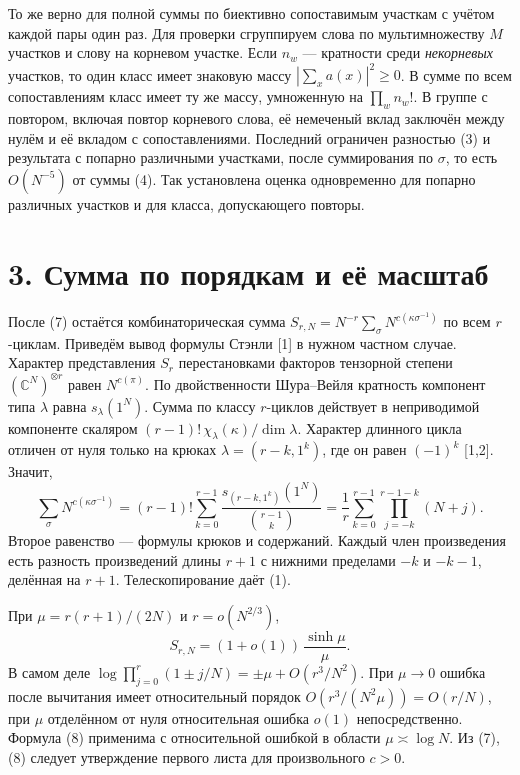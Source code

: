 \documentclass[11pt,a4paper]{article}
\newcommand{\C}{\mathbb C}
\newcommand{\sect}[1]{\section*{\sffamily\color{ink}#1}}
\begin{document}
То же верно для полной суммы по биективно сопоставимым участкам с учётом каждой пары один раз. Для проверки сгруппируем слова по мультимножеству $M$ участков и слову на корневом участке. Если $n_w$ --- кратности среди \emph{некорневых} участков, то один класс имеет знаковую массу $|\sum_x a(x)|^2\ge0$. В сумме по всем сопоставлениям класс имеет ту же массу, умноженную на $\prod_w n_w!$. В группе с повтором, включая повтор корневого слова, её немеченый вклад заключён между нулём и её вкладом с сопоставлениями. Последний ограничен разностью (3) и результата с попарно различными участками, после суммирования по $\sigma$, то есть $O(N^{-5})$ от суммы (4). Так установлена оценка одновременно для попарно различных участков и для класса, допускающего повторы.
\newpage
\sect{3. Сумма по порядкам и её масштаб}
После (7) остаётся комбинаторическая сумма $S_{r,N}=N^{-r}\sum_{\sigma}N^{c(\kappa\sigma^{-1})}$ по всем $r$-циклам. Приведём вывод формулы Стэнли [1] в нужном частном случае. Характер представления $S_r$ перестановками факторов тензорной степени $(\C^N)^{\otimes r}$ равен $N^{c(\pi)}$. По двойственности Шура--Вейля кратность компонент типа $\lambda$ равна $s_\lambda(1^N)$. Сумма по классу $r$-циклов действует в неприводимой компоненте скаляром $(r-1)!\,\chi_\lambda(\kappa)/\dim\lambda$. Характер длинного цикла отличен от нуля только на крюках $\lambda=(r-k,1^k)$, где он равен $(-1)^k$ [1,2]. Значит,
\[
    \sum_{\sigma}N^{c(\kappa\sigma^{-1})}
       =(r-1)!\sum_{k=0}^{r-1}
           \frac{s_{(r-k,1^k)}(1^N)}{\binom{r-1}{k}}
       =\frac1r\sum_{k=0}^{r-1}\prod_{j=-k}^{r-1-k}(N+j).
\]
Второе равенство --- формулы крюков и содержаний. Каждый член произведения есть разность произведений длины $r+1$ с нижними пределами $-k$ и $-k-1$, делённая на $r+1$. Телескопирование даёт (1).

При $\mu=r(r+1)/(2N)$ и $r=o(N^{2/3})$,
\[
             S_{r,N}=(1+o(1))\,\frac{\sinh\mu}{\mu}.                  \tag{8}
\]
В самом деле $\log\prod_{j=0}^r(1\pm j/N)=\pm\mu+O(r^3/N^2)$. При $\mu\to0$ ошибка после вычитания имеет относительный порядок $O(r^3/(N^2\mu))=O(r/N)$, при $\mu$ отделённом от нуля относительная ошибка $o(1)$ непосредственно. Формула (8) применима с относительной ошибкой в области $\mu\asymp\log N$. Из (7),(8) следует утверждение первого листа для произвольного $c>0$.
\end{document}
